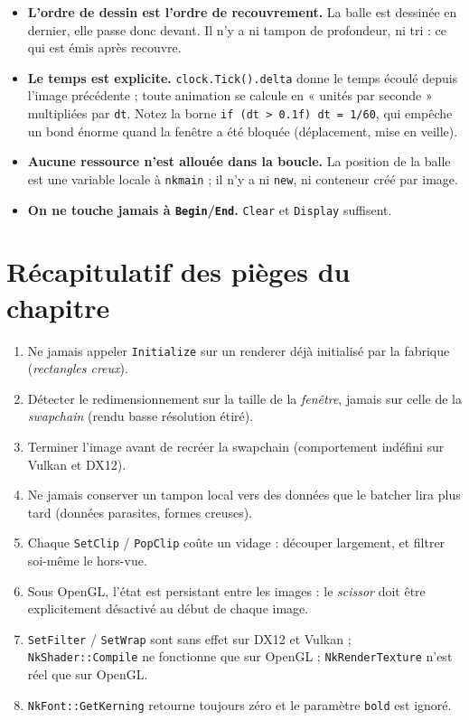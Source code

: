 \begin{itemize}
  \item \textbf{L'ordre de dessin est l'ordre de recouvrement.} La balle est
        dessinée en dernier, elle passe donc devant. Il n'y a ni tampon de
        profondeur, ni tri : ce qui est émis après recouvre.
  \item \textbf{Le temps est explicite.} \texttt{clock.Tick().delta} donne le
        temps écoulé depuis l'image précédente ; toute animation se calcule en
        « unités par seconde » multipliées par \texttt{dt}. Notez la borne
        \texttt{if (dt > 0.1f) dt = 1/60}, qui empêche un bond énorme quand la
        fenêtre a été bloquée (déplacement, mise en veille).
  \item \textbf{Aucune ressource n'est allouée dans la boucle.} La position de la
        balle est une variable locale à \texttt{nkmain} ; il n'y a ni
        \texttt{new}, ni conteneur créé par image.
  \item \textbf{On ne touche jamais à \texttt{Begin}/\texttt{End}.}
        \texttt{Clear} et \texttt{Display} suffisent.
\end{itemize}

\section{Récapitulatif des pièges du chapitre}

\begin{enumerate}
  \item Ne jamais appeler \texttt{Initialize} sur un renderer déjà initialisé
        par la fabrique (\emph{rectangles creux}).
  \item Détecter le redimensionnement sur la taille de la \emph{fenêtre}, jamais
        sur celle de la \emph{swapchain} (rendu basse résolution étiré).
  \item Terminer l'image avant de recréer la swapchain (comportement indéfini
        sur Vulkan et DX12).
  \item Ne jamais conserver un tampon local vers des données que le batcher lira
        plus tard (données parasites, formes creuses).
  \item Chaque \texttt{SetClip} / \texttt{PopClip} coûte un vidage : découper
        largement, et filtrer soi-même le hors-vue.
  \item Sous OpenGL, l'état est persistant entre les images : le \emph{scissor}
        doit être explicitement désactivé au début de chaque image.
  \item \texttt{SetFilter} / \texttt{SetWrap} sont sans effet sur DX12 et Vulkan ;
        \texttt{NkShader::Compile} ne fonctionne que sur OpenGL ;
        \texttt{NkRenderTexture} n'est réel que sur OpenGL.
  \item \texttt{NkFont::GetKerning} retourne toujours zéro et le paramètre
        \texttt{bold} est ignoré.
\end{enumerate}

